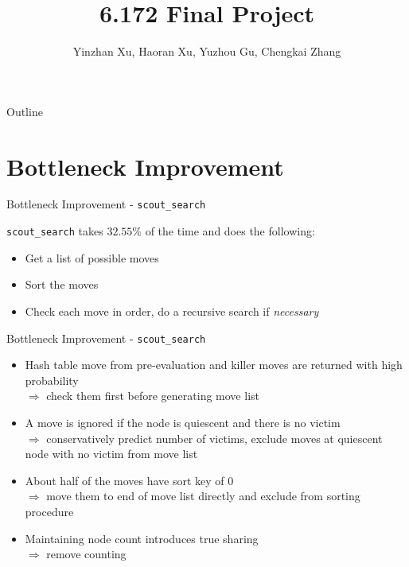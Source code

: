 \documentclass[10pt]{beamer}
\newcommand{\itema}{\item[*]}
\begin{document}
	\title{6.172 Final Project}
	\author{Yinzhan Xu, Haoran Xu, Yuzhou Gu, Chengkai Zhang}
	\date{}

	\begin{frame}
		\titlepage
	\end{frame}

    \begin{frame}{Outline}
    \tableofcontents
    \end{frame}

    \section{Bottleneck Improvement}
    \begin{frame}{Bottleneck Improvement - \tt{scout\_search}}

        {\tt scout\_search} takes $32.55\%$ of the time and does the following:
        \begin{itemize}
            \itema Get a list of possible moves
            \itema Sort the moves
            \itema Check each move in order, do a recursive search if {\it necessary}
        \end{itemize}
    \end{frame}

	\begin{frame}{Bottleneck Improvement - \tt{scout\_search}}
	    \begin{itemize}
	        \itema Hash table move from pre-evaluation and killer moves are returned with high probability \\
	        $\Rightarrow$ check them first before generating move list
	        \itema A move is ignored if the node is quiescent and there is no victim\\
	        $\Rightarrow$ conservatively predict number of victims, exclude moves at quiescent node with no victim from move list
	        \itema About half of the moves have sort key of 0 \\
	        $\Rightarrow$ move them to end of move list directly and exclude from sorting procedure
	        \itema Maintaining node count introduces true sharing \\
	        $\Rightarrow$ remove counting
	    \end{itemize}


	\end{frame}
\end{document}
